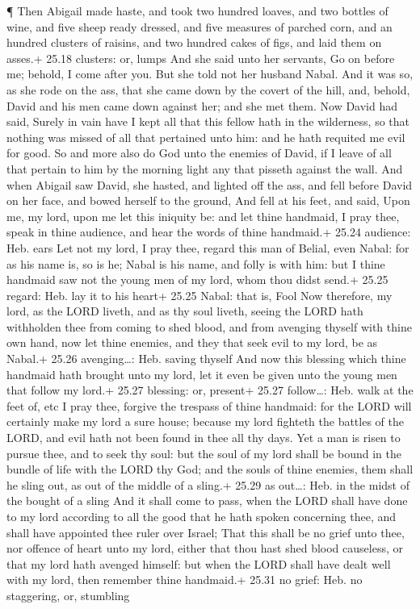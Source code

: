  ¶ Then Abigail made haste, and took two hundred loaves,
and two bottles of wine, and five sheep ready dressed, and five measures
of parched corn, and an hundred clusters of raisins, and two hundred
cakes of figs, and laid them on asses.+ 25.18 clusters: or, lumps
 And she said unto her servants, Go on before me; behold, I
come after you. But she told not her husband Nabal.  And it
was so, as she rode on the ass, that she came down by the covert of the
hill, and, behold, David and his men came down against her; and she met
them.  Now David had said, Surely in vain have I kept all
that this fellow hath in the wilderness, so that nothing was missed of
all that pertained unto him: and he hath requited me evil for good.
 So and more also do God unto the enemies of David, if I
leave of all that pertain to him by the morning light any that pisseth
against the wall.  And when Abigail saw David, she hasted,
and lighted off the ass, and fell before David on her face, and bowed
herself to the ground,  And fell at his feet, and said,
Upon me, my lord, upon me let this iniquity be: and let thine handmaid,
I pray thee, speak in thine audience, and hear the words of thine
handmaid.+ 25.24 audience: Heb. ears  Let not my lord, I
pray thee, regard this man of Belial, even Nabal: for as his name is, so
is he; Nabal is his name, and folly is with him: but I thine handmaid
saw not the young men of my lord, whom thou didst send.+ 25.25 regard:
Heb. lay it to his heart+ 25.25 Nabal: that is, Fool  Now
therefore, my lord, as the LORD liveth, and as thy soul liveth, seeing
the LORD hath withholden thee from coming to shed blood, and from
avenging thyself with thine own hand, now let thine enemies, and they
that seek evil to my lord, be as Nabal.+ 25.26 avenging\ldots: Heb.
saving thyself  And now this blessing which thine handmaid
hath brought unto my lord, let it even be given unto the young men that
follow my lord.+ 25.27 blessing: or, present+ 25.27 follow\ldots: Heb.
walk at the feet of, etc  I pray thee, forgive the trespass
of thine handmaid: for the LORD will certainly make my lord a sure
house; because my lord fighteth the battles of the LORD, and evil hath
not been found in thee all thy days.  Yet a man is risen to
pursue thee, and to seek thy soul: but the soul of my lord shall be
bound in the bundle of life with the LORD thy God; and the souls of
thine enemies, them shall he sling out, as out of the middle of a
sling.+ 25.29 as out\ldots: Heb. in the midst of the bought of a sling
 And it shall come to pass, when the LORD shall have done
to my lord according to all the good that he hath spoken concerning
thee, and shall have appointed thee ruler over Israel; 
That this shall be no grief unto thee, nor offence of heart unto my
lord, either that thou hast shed blood causeless, or that my lord hath
avenged himself: but when the LORD shall have dealt well with my lord,
then remember thine handmaid.+ 25.31 no grief: Heb. no staggering, or,
stumbling

